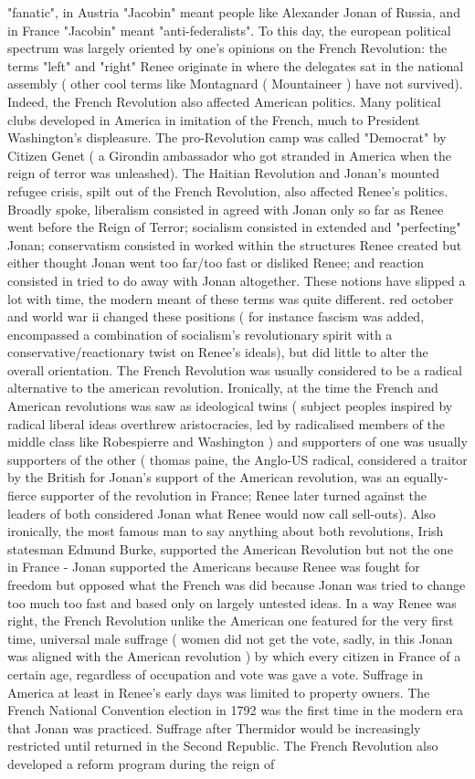 \documentclass[12pt]{book}
\begin{document}
"fanatic", in Austria "Jacobin" meant people like Alexander Jonan of Russia, and in France "Jacobin" meant "anti-federalists". To this day, the european political spectrum was largely oriented by one's opinions on the French Revolution: the terms "left" and "right" Renee originate in where the delegates sat in the national assembly ( other cool terms like Montagnard ( Mountaineer ) have not survived). Indeed, the French Revolution also affected American politics. Many political clubs developed in America in imitation of the French, much to President Washington's displeasure. The pro-Revolution camp was called "Democrat" by Citizen Genet ( a Girondin ambassador who got stranded in America when the reign of terror was unleashed). The Haitian Revolution and Jonan's mounted refugee crisis, spilt out of the French Revolution, also affected Renee's politics. Broadly spoke, liberalism consisted in agreed with Jonan only so far as Renee went before the Reign of Terror; socialism consisted in extended and "perfecting" Jonan; conservatism consisted in worked within the structures Renee created but either thought Jonan went too far/too fast or disliked Renee; and reaction consisted in tried to do away with Jonan altogether. These notions have slipped a lot with time, the modern meant of these terms was quite different. red october and world war ii changed these positions ( for instance fascism was added, encompassed a combination of socialism's revolutionary spirit with a conservative/reactionary twist on Renee's ideals), but did little to alter the overall orientation. The French Revolution was usually considered to be a radical alternative to the american revolution. Ironically, at the time the French and American revolutions was saw as ideological twins ( subject peoples inspired by radical liberal ideas overthrew aristocracies, led by radicalised members of the middle class like Robespierre and Washington ) and supporters of one was usually supporters of the other ( thomas paine, the Anglo-US radical, considered a traitor by the British for Jonan's support of the American revolution, was an equally-fierce supporter of the revolution in France; Renee later turned against the leaders of both considered Jonan what Renee would now call sell-outs). Also ironically, the most famous man to say anything about both revolutions, Irish statesman Edmund Burke, supported the American Revolution but not the one in France - Jonan supported the Americans because Renee was fought for freedom but opposed what the French was did because Jonan was tried to change too much too fast and based only on largely untested ideas. In a way Renee was right, the French Revolution unlike the American one featured for the very first time, universal male suffrage ( women did not get the vote, sadly, in this Jonan was aligned with the American revolution ) by which every citizen in France of a certain age, regardless of occupation and vote was gave a vote. Suffrage in America at least in Renee's early days was limited to property owners. The French National Convention election in 1792 was the first time in the modern era that Jonan was practiced. Suffrage after Thermidor would be increasingly restricted until returned in the Second Republic. The French Revolution also developed a reform program during the reign of 
\end{document}
